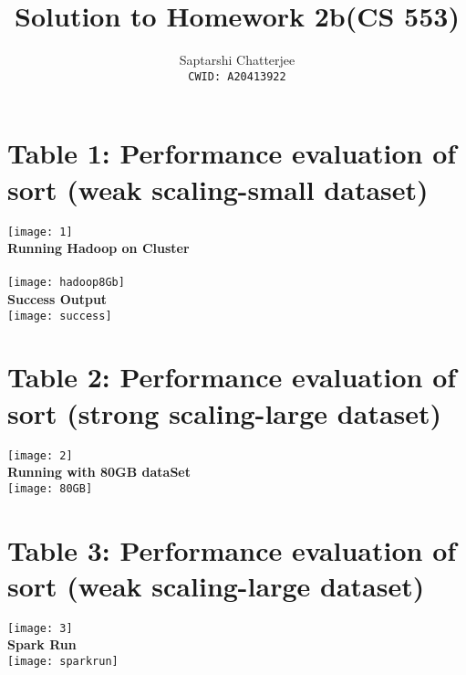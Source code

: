 \documentclass[3pt]{article}
\title{Solution to Homework 2b(CS 553)}
\author{Saptarshi Chatterjee \\
\texttt{CWID: A20413922}
}
\begin{document}
\maketitle

\section{Table 1: Performance evaluation of sort (weak scaling-small dataset) }

\setlength{\parskip}{1.2em}
\setlength{\parindent}{0em}


\texttt{[image: 1]} \\

\textbf{Running Hadoop on Cluster} \\
\\
\texttt{[image: hadoop8Gb]} \\

\textbf{Success Output} \\

\texttt{[image: success]} \\

\section{Table 2: Performance evaluation of sort (strong scaling-large dataset)}

\setlength{\parskip}{1.2em}
\setlength{\parindent}{0em}


\texttt{[image: 2]} \\

\textbf{Running with 80GB dataSet} \\

\texttt{[image: 80GB]} \\

\section{Table 3: Performance evaluation of sort (weak scaling-large dataset)}

\setlength{\parskip}{1.2em}
\setlength{\parindent}{0em}


\texttt{[image: 3]} \\

\textbf{Spark Run} \\

\texttt{[image: sparkrun]} \\
\end{document}

